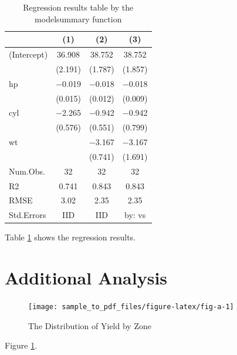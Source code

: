 \documentclass[
]{article}
\begin{document}
\begin{table}

\caption{\label{tab:reg-table}Regression results table by the modelsummary function}
\centering
\begin{tabular}[t]{lccc}
\toprule
  & (1) & (2) & (3)\\
\midrule
(Intercept) & \num{36.908} & \num{38.752} & \num{38.752}\\
 & (\num{2.191}) & (\num{1.787}) & (\num{1.857})\\
hp & \num{-0.019} & \num{-0.018} & \num{-0.018}\\
 & (\num{0.015}) & (\num{0.012}) & (\num{0.009})\\
cyl & \num{-2.265} & \num{-0.942} & \num{-0.942}\\
 & (\num{0.576}) & (\num{0.551}) & (\num{0.799})\\
wt &  & \num{-3.167} & \num{-3.167}\\
 &  & (\num{0.741}) & (\num{1.691})\\
\midrule
Num.Obs. & \num{32} & \num{32} & \num{32}\\
R2 & \num{0.741} & \num{0.843} & \num{0.843}\\
RMSE & \num{3.02} & \num{2.35} & \num{2.35}\\
Std.Errors & IID & IID & by: vs\\
\bottomrule
\end{tabular}
\end{table}

Table \ref{tab:reg-table} shows the regression results.

\newpage

\hypertarget{appendix-appendix}{%
\appendix}


\hypertarget{additional-analysis}{%
\section{Additional Analysis}\label{additional-analysis}}

\setcounter{figure}{0}
\renewcommand{\thefigure}{A.\arabic{figure}}

\begin{figure}

{\centering \texttt{[image: sample\_to\_pdf\_files/figure-latex/fig-a-1]} 

}

\caption{The Distribution of Yield by Zone}\label{fig:fig-a}
\end{figure}

Figure \ref{fig:fig-a}.

  
\end{document}

